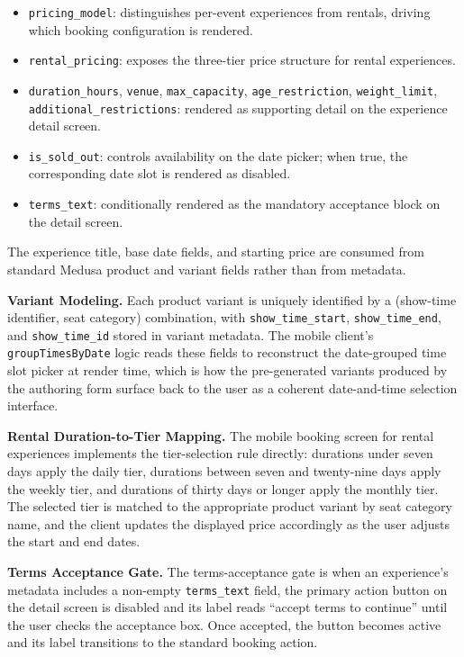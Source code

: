 \begin{itemize}
  \item \texttt{pricing\_model}: distinguishes per-event experiences from rentals, driving which booking configuration is rendered.
  \item \texttt{rental\_pricing}: exposes the three-tier price structure for rental experiences.
  \item \texttt{duration\_\allowbreak hours}, \texttt{venue}, \texttt{max\_\allowbreak capacity}, \texttt{age\_\allowbreak restriction}, \texttt{weight\_\allowbreak limit}, \texttt{additional\_\allowbreak restrictions}: rendered as supporting detail on the experience detail screen.
  \item \texttt{is\_sold\_out}: controls availability on the date picker; when true, the corresponding date slot is rendered as disabled.
  \item \texttt{terms\_text}: conditionally rendered as the mandatory acceptance block on the detail screen.
\end{itemize}

The experience title, base date fields, and starting price are consumed from standard Medusa product and variant fields rather than from metadata.

\textbf{Variant Modeling.} Each product variant is uniquely identified by a (show-time identifier, seat category) combination, with \texttt{show\_time\_start}, \texttt{show\_time\_end}, and \texttt{show\_time\_id} stored in variant metadata. The mobile client's \texttt{groupTimesByDate} logic reads these fields to reconstruct the date-grouped time slot picker at render time, which is how the pre-generated variants produced by the authoring form surface back to the user as a coherent date-and-time selection interface.

\textbf{Rental Duration-to-Tier Mapping.} The mobile booking screen for rental experiences implements the tier-selection rule directly: durations under seven days apply the daily tier, durations between seven and twenty-nine days apply the weekly tier, and durations of thirty days or longer apply the monthly tier. The selected tier is matched to the appropriate product variant by seat category name, and the client updates the displayed price accordingly as the user adjusts the start and end dates.

\textbf{Terms Acceptance Gate.} The terms-acceptance gate is when an experience's metadata includes a non-empty \texttt{terms\_text} field, the primary action button on the detail screen is disabled and its label reads ``accept terms to continue'' until the user checks the acceptance box. Once accepted, the button becomes active and its label transitions to the standard booking action.

